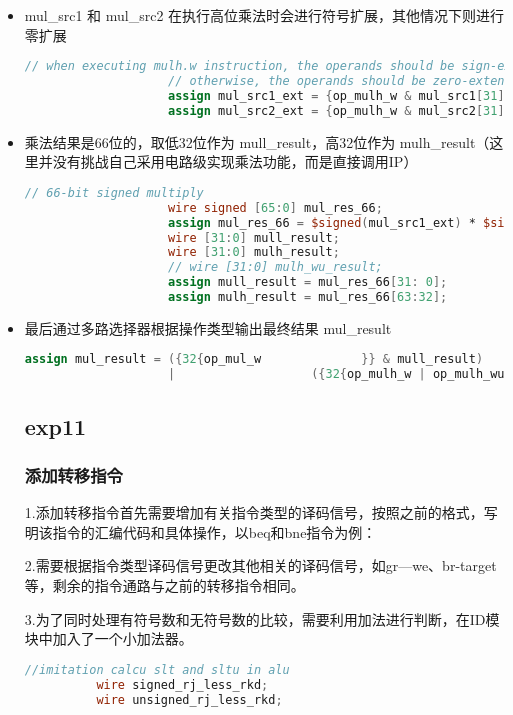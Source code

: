 \documentclass[12pt,a4paper]{article}
\begin{document}
            \begin{itemize}
                \item mul_src1 和 mul_src2 在执行高位乘法时会进行符号扩展，其他情况下则进行零扩展
                \begin{lstlisting}[language=Verilog]
                    // when executing mulh.w instruction, the operands should be sign-extended;
                    // otherwise, the operands should be zero-extended
                    assign mul_src1_ext = {op_mulh_w & mul_src1[31], mul_src1};
                    assign mul_src2_ext = {op_mulh_w & mul_src2[31], mul_src2};
                \end{lstlisting}
                \item 乘法结果是66位的，取低32位作为 mull_result，高32位作为 mulh_result（这里并没有挑战自己采用电路级实现乘法功能，而是直接调用IP）
                \begin{lstlisting}[language=Verilog]
                    // 66-bit signed multiply
                    wire signed [65:0] mul_res_66;
                    assign mul_res_66 = $signed(mul_src1_ext) * $signed(mul_src2_ext);
                    wire [31:0] mull_result;
                    wire [31:0] mulh_result;
                    // wire [31:0] mulh_wu_result;
                    assign mull_result = mul_res_66[31: 0];
                    assign mulh_result = mul_res_66[63:32];
                \end{lstlisting}
                \item 最后通过多路选择器根据操作类型输出最终结果 mul_result
                \begin{lstlisting}[language=Verilog]
                    assign mul_result = ({32{op_mul_w              }} & mull_result)
                    |                   ({32{op_mulh_w | op_mulh_wu}} & mulh_result);
                \end{lstlisting}

    \subsection{exp11}
        \subsubsection{添加转移指令}
          1.添加转移指令首先需要增加有关指令类型的译码信号，按照之前的格式，写明该指令的汇编代码和具体操作，以beq和bne指令为例：
          \par
          2.需要根据指令类型译码信号更改其他相关的译码信号，如gr—we、br-target等，剩余的指令通路与之前的转移指令相同。
          \par
          3.为了同时处理有符号数和无符号数的比较，需要利用加法进行判断，在ID模块中加入了一个小加法器。
          \begin{lstlisting}[language=Verilog]
            //imitation calcu slt and sltu in alu
          wire signed_rj_less_rkd;
          wire unsigned_rj_less_rkd;


\end{lstlisting}
\end{itemize}
\end{document}
